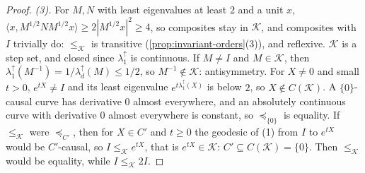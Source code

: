 \begin{proof}
\emph{(3).} For $M, N$ with least eigenvalues at least $2$ and a unit $x$,
$\langle x, M^{1/2}NM^{1/2}x\rangle \ge 2|M^{1/2}x|^2 \ge 4$, so composites stay in $\mathcal K$, and
composites with $I$ trivially do: $\le_{\mathcal K}$ is transitive (\ref{prop:invariant-orders}(3)), and
reflexive. $\mathcal K$ is a step set, and closed since $\lambda^\uparrow_1$ is continuous. If $M \ne I$ and
$M \in \mathcal K$, then $\lambda^\uparrow_1(M^{-1}) = 1/\lambda^\uparrow_d(M) \le 1/2$, so $M^{-1} \notin
\mathcal K$: antisymmetry. For $X \ne 0$ and small $t > 0$, $e^{tX} \ne I$ and its least eigenvalue
$e^{t\lambda^\uparrow_1(X)}$ is below $2$, so $X \notin C(\mathcal K)$. A $\{0\}$-causal curve has
derivative $0$ almost everywhere, and an absolutely continuous curve with derivative $0$ almost everywhere is
constant, so $\preceq_{\{0\}}$ is equality. If $\le_{\mathcal K}$ were $\preceq_{C'}$, then for $X \in C'$ and
$t \ge 0$ the geodesic of (1) from $I$ to $e^{tX}$ would be $C'$-causal, so $I \le_{\mathcal K} e^{tX}$, that is
$e^{tX} \in \mathcal K$: $C' \subseteq C(\mathcal K) = \{0\}$. Then $\le_{\mathcal K}$ would be equality,
while $I \le_{\mathcal K} 2I$.


\end{proof}
